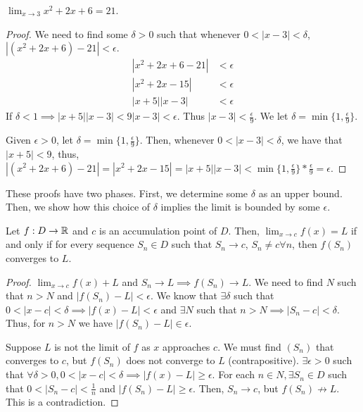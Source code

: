 \begin{theorem}
    $\lim_{x \to 3} x^2 + 2x + 6 = 21$.
\end{theorem}
\begin{proof}
    We need to find some $\delta > 0$ such that whenever $0 < |x - 3| < \delta$, $|(x^2 + 2x + 6) - 21| < \epsilon$.
    \begin{align*}
        |x^2 + 2x + 6 - 21| &< \epsilon \\
        |x^2 + 2x - 15| &< \epsilon \\
        |x + 5||x - 3| &< \epsilon
    \end{align*}
    If $\delta < 1 \implies |x + 5||x - 3| < 9|x - 3| < \epsilon$. Thus $|x - 3| < \frac{\epsilon}{9}$. We let $\delta = \min\{1, \frac{\epsilon}{9}\}$.

    Given $\epsilon > 0$, let $\delta = \min\{1, \frac{\epsilon}{9}\}$. Then, whenever $0 < |x - 3| < \delta$, we have that $|x + 5| < 9$, thus, $|(x^2 + 2x + 6) - 21| = |x^2 + 2x - 15| = |x + 5||x - 3| < \min\{1, \frac{\epsilon}{9}\} * \frac{\epsilon}{9} = \epsilon$.
\end{proof}
\begin{remark}
    These proofs have two phases. First, we determine some $\delta$ as an upper bound. Then, we show how this choice of $\delta$ implies the limit is bounded by some $\epsilon$.
\end{remark}

\begin{theorem}
    Let $f:D \to \mathbb{R}$ and $c$ is an accumulation point of $D$. Then, $\lim_{x \to c} f(x) = L$ if and only if for every sequence $S_n \in D$ such that $S_n \to c$, $S_n \neq c \forall n$, then $f(S_n)$ converges to $L$.
\end{theorem}
\begin{proof}
    $\lim_{x \to c} f(x) + L$ and $S_n \to L \implies f(S_n) \to L$. We need to find $N$ such that $n > N$ and $|f(S_n) - L| < \epsilon$. We know that $\exists \delta$ such that $0 < |x - c| < \delta \implies |f(x) - L| < \epsilon$ and $\exists N$ such that $n > N \implies |S_n - c| < \delta$. Thus, for $n > N$ we have $|f(S_n) - L| \in \epsilon$.

    Suppose $L$ is not the limit of $f$ as $x$ approaches $c$. We must find $(S_n)$ that converges to $c$, but $f(S_n)$ does not converge to $L$ (contrapositive). $\exists \epsilon > 0$ such that $\forall \delta > 0, 0 < |x - c| < \delta \implies |f(x) - L| \geq \epsilon$. For each $n \in N, \exists S_n \in D$ such that $0 < |S_n - c| < \frac{1}{n}$ and $|f(S_n) - L| \geq \epsilon$. Then, $S_n \to c$, but $f(S_n) \not\to L$. This is a contradiction.
\end{proof}
